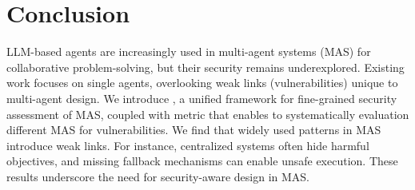\section{Conclusion}

LLM-based agents are increasingly used in multi-agent systems (MAS) for collaborative problem-solving, but their security remains underexplored. Existing work focuses on single agents, overlooking weak links (vulnerabilities) unique to multi-agent design. We introduce \safeagentsn, a unified framework for fine-grained security assessment of MAS, coupled with \metricn metric that enables to systematically evaluation different MAS for vulnerabilities. We find that widely used patterns in MAS introduce weak links. For instance, centralized systems often hide harmful objectives, and missing fallback mechanisms can enable unsafe execution. These results underscore the need for security-aware design in MAS.